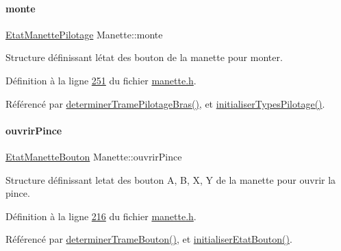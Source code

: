 \mbox{\label{class_manette_a63d9a39ea238e105d7491b87f0a3f87d}} 
\paragraph{\texorpdfstring{monte}{monte}}
{\footnotesize\ttfamily \hyperlink{struct_etat_manette_pilotage}{Etat\+Manette\+Pilotage} Manette\+::monte\hspace{0.3cm}{\ttfamily [private]}}



Structure définissant l\textquotesingle{}état des bouton de la manette pour monter. 



Définition à la ligne \hyperlink{manette_8h_source_l00251}{251} du fichier \hyperlink{manette_8h_source}{manette.\+h}.



Référencé par \hyperlink{manette_8cpp_source_l00375}{determiner\+Trame\+Pilotage\+Bras()}, et \hyperlink{manette_8cpp_source_l00040}{initialiser\+Types\+Pilotage()}.

\mbox{\label{class_manette_a066eacf19e615fd72690477c043e3703}} 
\paragraph{\texorpdfstring{ouvrir\+Pince}{ouvrirPince}}
{\footnotesize\ttfamily \hyperlink{struct_etat_manette_bouton}{Etat\+Manette\+Bouton} Manette\+::ouvrir\+Pince\hspace{0.3cm}{\ttfamily [private]}}



Structure définissant l\textquotesingle{}etat des bouton A, B, X, Y de la manette pour ouvrir la pince. 



Définition à la ligne \hyperlink{manette_8h_source_l00216}{216} du fichier \hyperlink{manette_8h_source}{manette.\+h}.



Référencé par \hyperlink{manette_8cpp_source_l00393}{determiner\+Trame\+Bouton()}, et \hyperlink{manette_8cpp_source_l00313}{initialiser\+Etat\+Bouton()}.

\mbox{\label{class_manette_a93fc38a8ca8fbb1cc57cedbab059c56f}} 

